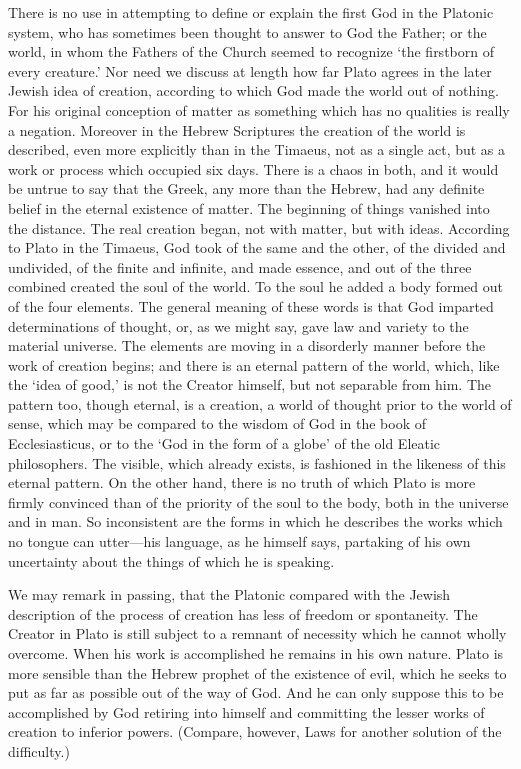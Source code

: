 There is no use in attempting to define or explain the first God in the
Platonic system, who has sometimes been thought to answer to God the
Father; or the world, in whom the Fathers of the Church seemed to
recognize ‘the firstborn of every creature.’ Nor need we discuss at length
how far Plato agrees in the later Jewish idea of creation, according to
which God made the world out of nothing. For his original conception of
matter as something which has no qualities is really a negation. Moreover
in the Hebrew Scriptures the creation of the world is described, even more
explicitly than in the Timaeus, not as a single act, but as a work or
process which occupied six days. There is a chaos in both, and it would be
untrue to say that the Greek, any more than the Hebrew, had any definite
belief in the eternal existence of matter. The beginning of things
vanished into the distance. The real creation began, not with matter, but
with ideas. According to Plato in the Timaeus, God took of the same and
the other, of the divided and undivided, of the finite and infinite, and
made essence, and out of the three combined created the soul of the world.
To the soul he added a body formed out of the four elements. The general
meaning of these words is that God imparted determinations of thought, or,
as we might say, gave law and variety to the material universe. The
elements are moving in a disorderly manner before the work of creation
begins; and there is an eternal pattern of the world, which, like the
‘idea of good,’ is not the Creator himself, but not separable from him.
The pattern too, though eternal, is a creation, a world of thought prior
to the world of sense, which may be compared to the wisdom of God in the
book of Ecclesiasticus, or to the ‘God in the form of a globe’ of the old
Eleatic philosophers. The visible, which already exists, is fashioned in
the likeness of this eternal pattern. On the other hand, there is no truth
of which Plato is more firmly convinced than of the priority of the soul
to the body, both in the universe and in man. So inconsistent are the
forms in which he describes the works which no tongue can utter—his
language, as he himself says, partaking of his own uncertainty about the
things of which he is speaking.

We may remark in passing, that the Platonic compared with the Jewish
description of the process of creation has less of freedom or spontaneity.
The Creator in Plato is still subject to a remnant of necessity which he
cannot wholly overcome. When his work is accomplished he remains in his
own nature. Plato is more sensible than the Hebrew prophet of the
existence of evil, which he seeks to put as far as possible out of the way
of God. And he can only suppose this to be accomplished by God retiring
into himself and committing the lesser works of creation to inferior
powers. (Compare, however, Laws for another solution of the difficulty.)

